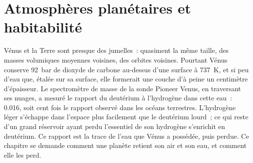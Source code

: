 \chapter{Atmosphères planétaires et habitabilité}\label{ch:b3:planetary-atmospheres}

Vénus et la Terre sont presque des jumelles~: quasiment la même taille, des
masses volumiques moyennes voisines, des orbites voisines. Pourtant Vénus conserve \qty{92}{bar} de dioxyde de carbone
au-dessus d'une surface à \qty{737}{K}, et si peu d'eau que, étalée
sur sa surface, elle formerait une couche d'à peine un centimètre d'épaisseur. Le spectromètre de masse
de la sonde Pioneer Venus, en traversant ses nuages, a mesuré le rapport du
deutérium à l'hydrogène dans cette eau~: \num{0.016}, soit cent fois le
rapport observé dans les océans terrestres. L'hydrogène léger s'échappe dans
l'espace plus facilement que le deutérium lourd~; ce qui reste d'un grand réservoir
ayant perdu l'essentiel de son hydrogène s'enrichit en deutérium. Ce rapport est la
trace de l'eau que Vénus a possédée, puis perdue. Ce chapitre se demande comment une
planète retient son air et son eau, et comment elle les perd.

